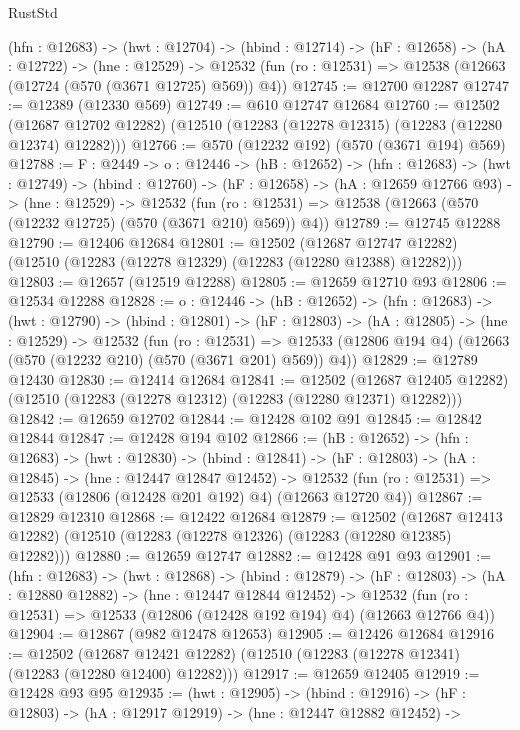 \begin{lexlean}{RustStd}
\begin{coremodule}
  (hfn : @12683) ->
  (hwt : @12704) ->
  (hbind : @12714) ->
  (hF : @12658) ->
  (hA : @12722) ->
  (hne : @12529) ->
  @12532 (fun (ro : @12531) => @12538 (@12663 (@12724 (@570 (@3671 @12725) @569)) @4))
@12745 := @12700 @12287
@12747 := @12389 (@12330 @569)
@12749 := @610 @12747 @12684
@12760 := @12502
    (@12687 @12702 @12282)
    (@12510 (@12283 (@12278 @12315) (@12283 (@12280 @12374) @12282)))
@12766 := @570 (@12232 @192) (@570 (@3671 @194) @569)
@12788 := {F : @2449} ->
  {o : @12446} ->
  (hB : @12652) ->
  (hfn : @12683) ->
  (hwt : @12749) ->
  (hbind : @12760) ->
  (hF : @12658) ->
  (hA : @12659 @12766 @93) ->
  (hne : @12529) ->
  @12532 (fun (ro : @12531) => @12538 (@12663 (@570 (@12232 @12725) (@570 (@3671 @210) @569)) @4))
@12789 := @12745 @12288
@12790 := @12406 @12684
@12801 := @12502
    (@12687 @12747 @12282)
    (@12510 (@12283 (@12278 @12329) (@12283 (@12280 @12388) @12282)))
@12803 := @12657 (@12519 @12288)
@12805 := @12659 @12710 @93
@12806 := @12534 @12288
@12828 := {o : @12446} ->
  (hB : @12652) ->
  (hfn : @12683) ->
  (hwt : @12790) ->
  (hbind : @12801) ->
  (hF : @12803) ->
  (hA : @12805) ->
  (hne : @12529) ->
  @12532
    (fun (ro : @12531) =>
    @12533 (@12806 @194 @4) (@12663 (@570 (@12232 @210) (@570 (@3671 @201) @569)) @4))
@12829 := @12789 @12430
@12830 := @12414 @12684
@12841 := @12502
    (@12687 @12405 @12282)
    (@12510 (@12283 (@12278 @12312) (@12283 (@12280 @12371) @12282)))
@12842 := @12659 @12702
@12844 := @12428 @102 @91
@12845 := @12842 @12844
@12847 := @12428 @194 @102
@12866 := (hB : @12652) ->
  (hfn : @12683) ->
  (hwt : @12830) ->
  (hbind : @12841) ->
  (hF : @12803) ->
  (hA : @12845) ->
  (hne : @12447 @12847 @12452) ->
  @12532 (fun (ro : @12531) => @12533 (@12806 (@12428 @201 @192) @4) (@12663 @12720 @4))
@12867 := @12829 @12310
@12868 := @12422 @12684
@12879 := @12502
    (@12687 @12413 @12282)
    (@12510 (@12283 (@12278 @12326) (@12283 (@12280 @12385) @12282)))
@12880 := @12659 @12747
@12882 := @12428 @91 @93
@12901 := (hfn : @12683) ->
  (hwt : @12868) ->
  (hbind : @12879) ->
  (hF : @12803) ->
  (hA : @12880 @12882) ->
  (hne : @12447 @12844 @12452) ->
  @12532 (fun (ro : @12531) => @12533 (@12806 (@12428 @192 @194) @4) (@12663 @12766 @4))
@12904 := @12867 (@982 @12478 @12653)
@12905 := @12426 @12684
@12916 := @12502
    (@12687 @12421 @12282)
    (@12510 (@12283 (@12278 @12341) (@12283 (@12280 @12400) @12282)))
@12917 := @12659 @12405
@12919 := @12428 @93 @95
@12935 := (hwt : @12905) ->
  (hbind : @12916) ->
  (hF : @12803) ->
  (hA : @12917 @12919) ->
  (hne : @12447 @12882 @12452) ->

\end{coremodule}
\end{lexlean}
